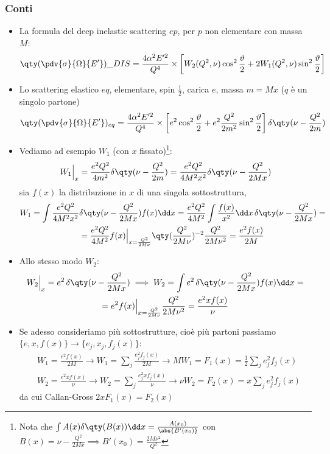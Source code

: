 \subsubsection{Conti}
\begin{itemize}
	\item La formula del deep inelastic scattering $ep$, per $p$ non elementare con massa $M$:
    \begin{equation*}
    \qty(\pdv{\sigma}{\Omega}{E'})\_{DIS}= \frac{4 \alpha^2 E'^2}{Q^4}\times \left[ W_2(Q^2, \nu) \cos^2 \frac{\vartheta}{2} + 2 W_1(Q^2, \nu) \sin^2 \frac{\vartheta}{2} \right] 
    \end{equation*}
    \item Lo scattering elastico $eq$, elementare, spin $\frac{1}{2}$, carica $e$, massa $m=Mx$ ($q$ è un singolo partone)
    \begin{equation*}
        \qty(\pdv{\sigma}{\Omega}{E'})_{eq}= \frac{4 \alpha^2 E'^2}{Q^4}\times \left[ e^2\cos^2\frac{\vartheta}{2}+e^2\frac{Q^2}{2m^2}\sin^2\frac{\vartheta}{2}\right]\delta\qty(\nu-\frac{Q^2}{2m})
    \end{equation*}
    \item Vediamo ad esempio $W_1$ (con $x$ fissato)\footnote{Nota che $\int A(x)\delta\qty(B(x))\dd x=\frac{A(x_0)}{\abs{B'(x_0)}}$ con $B(x)=\nu-\frac{Q^2}{2Mx}\implies B'(x_0)=\frac{2M\nu^2}{Q^2}$}:
    \begin{equation*}
    W_1\Big|_x=\frac{e^2Q^2}{4m^2}\delta\qty(\nu-\frac{Q^2}{2m})=\frac{e^2Q^2}{4M^2x^2}\delta\qty(\nu-\frac{Q^2}{2Mx})
    \end{equation*}
    sia $f(x)$ la distribuzione in $x$ di una singola sottostruttura,
    \begin{gather*}
    W_1=\int \frac{e^2Q^2}{4M^2x^2}\delta\qty(\nu-\frac{Q^2}{2Mx})f(x)\dd x=\frac{e^2Q^2}{4M^2}\int\frac{f(x)}{x^2}\dd x\,\delta\qty(\nu-\frac{Q^2}{2Mx})=\\
    =\frac{e^2Q^2}{4M^2}f(x)\Big|_{x=\frac{Q^2}{2M\nu}}\qty(\frac{Q^2}{2M\nu})^{-2}\frac{Q^2}{2M\nu^2}=\frac{e^2f(x)}{2M}
    \end{gather*}
    \item Allo stesso modo $W_2$:
    \begin{gather*}
    W_2\Big|_x=e^2\,\delta\qty(\nu-\frac{Q^2}{2Mx})\implies W_2=\int e^2\,\delta\qty(\nu-\frac{Q^2}{2Mx})f(x)\dd x=\\
    =e^2f(x)\Big|_{x=\frac{Q^2}{2M\nu}}\frac{Q^2}{2M\nu^2}=\frac{e^2xf(x)}{\nu}
    \end{gather*}
    \item Se adesso consideriamo più sottostrutture, cioè più partoni passiamo $\{e,x,f(x)\}\to\{e_j,x_j,f_j(x)\}$:
    \begin{align*}
    &W_1=\frac{e^2f(x)}{2M}\to W_1=\sum_j\frac{e^2_jf_j(x)}{2M}\to MW_1=F_1(x)=\frac{1}{2}\sum_j e^2_jf_j(x)\\
    &W_2=\frac{e^2xf(x)}{\nu}\to W_2=\sum_j\frac{e^2_jxf_j(x)}{\nu} \to \nu W_2=F_2(x)=x\sum_je^2_jf_j(x)
    \end{align*}
    da cui Callan-Gross $2xF_1(x)=F_2(x)$
\end{itemize}
